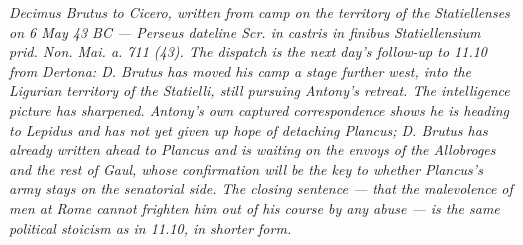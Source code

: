 
\textit{Decimus Brutus to Cicero, written from camp on the territory of the Statiellenses on 6 May 43 BC --- Perseus dateline \textit{Scr. in castris in finibus Statiellensium prid. Non. Mai. a. 711 (43)}. The dispatch is the next day's follow-up to 11.10 from Dertona: D. Brutus has moved his camp a stage further west, into the Ligurian territory of the Statielli, still pursuing Antony's retreat. The intelligence picture has sharpened. Antony's own captured correspondence shows he is heading to Lepidus and has not yet given up hope of detaching Plancus; D. Brutus has already written ahead to Plancus and is waiting on the envoys of the Allobroges and the rest of Gaul, whose confirmation will be the key to whether Plancus's army stays on the senatorial side. The closing sentence --- that the malevolence of men at Rome cannot frighten him out of his course by any abuse --- is the same political stoicism as in 11.10, in shorter form.}
